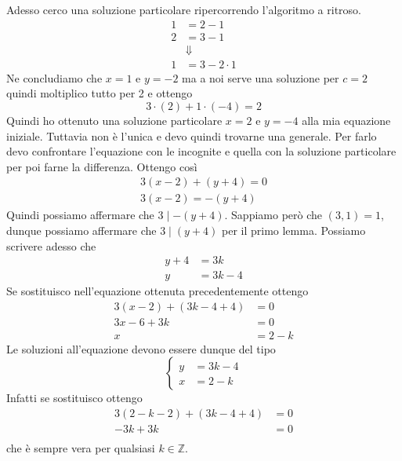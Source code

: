 \begin{example}
	Adesso cerco una soluzione particolare ripercorrendo l'algoritmo a ritroso.
	\begin{equation*}
		\begin{array}{ll}
			1 & = 2 - 1         \\
			2 & = 3 - 1         \\
			  & \Downarrow      \\
			1 & = 3 - 2 \cdot 1
		\end{array}
	\end{equation*}
	Ne concludiamo che $x = 1$ e $y = -2$ ma a noi serve una soluzione per $c = 2$ quindi
	moltiplico tutto per 2 e ottengo
	\begin{equation*}
		3 \cdot (2) + 1 \cdot (-4) = 2
	\end{equation*}
	Quindi ho ottenuto una soluzione particolare $x = 2$ e $y = -4$ alla mia equazione iniziale.
	Tuttavia non \`e l'unica e devo quindi trovarne una generale.
	Per farlo devo confrontare l'equazione con le incognite e quella con la soluzione particolare
	per poi farne la differenza. Ottengo cos\`i
	\begin{equation*}
		\begin{array}{l}
			3(x - 2) + (y + 4) = 0 \\
			3(x - 2) = -(y + 4)
		\end{array}
	\end{equation*}
	Quindi possiamo affermare che $3 \mid -(y + 4)$. Sappiamo per\`o che $(3, 1) = 1$, dunque
	possiamo affermare che $3 \mid (y + 4)$ per il primo lemma. Possiamo scrivere adesso che
	\begin{equation*}
		\begin{array}{rl}
			y + 4 & = 3k     \\
			y     & = 3k - 4
		\end{array}
	\end{equation*}
	Se sostituisco nell'equazione ottenuta precedentemente ottengo
	\begin{equation*}
		\begin{array}{rl}
			3(x - 2) + (3k - 4 + 4) & = 0     \\
			3x - 6 + 3k             & = 0     \\
			x                       & = 2 - k
		\end{array}
	\end{equation*}
	Le soluzioni all'equazione devono essere dunque del tipo
	\begin{equation*}
		\begin{cases}
			y & = 3k - 4 \\
			x & = 2 - k
		\end{cases}
	\end{equation*}
	Infatti se sostituisco ottengo
	\begin{equation*}
		\begin{array}{rl}
			3 (2 - k - 2) + (3k - 4 + 4) & = 0 \\
			-3k + 3k                     & = 0 \\
		\end{array}
	\end{equation*}
	che \`e sempre vera per qualsiasi $k \in \mathbb{Z}$.
\end{example}

